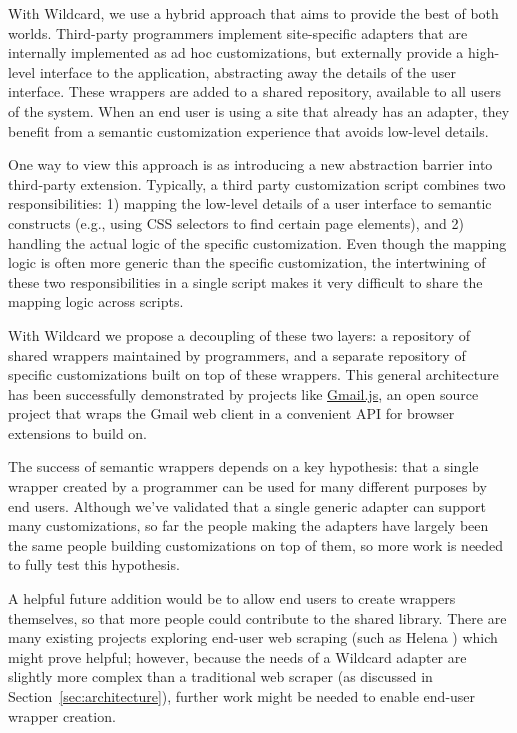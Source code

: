\documentclass[sigplan,screen,10pt,anonymous,review]{acmart}
\begin{document}
With Wildcard, we use a hybrid approach that aims to provide the best of
both worlds. Third-party programmers implement site-specific adapters
that are internally implemented as ad hoc customizations, but externally
provide a high-level interface to the application, abstracting away the
details of the user interface. These wrappers are added to a shared
repository, available to all users of the system. When an end user is
using a site that already has an adapter, they benefit from a semantic
customization experience that avoids low-level details.

One way to view this approach is as introducing a new abstraction
barrier into third-party extension. Typically, a third party
customization script combines two responsibilities: 1) mapping the
low-level details of a user interface to semantic constructs (e.g.,
using CSS selectors to find certain page elements), and 2) handling the
actual logic of the specific customization. Even though the mapping
logic is often more generic than the specific customization, the
intertwining of these two responsibilities in a single script makes it
very difficult to share the mapping logic across scripts.

With Wildcard we propose a decoupling of these two layers: a repository
of shared wrappers maintained by programmers, and a separate repository
of specific customizations built on top of these wrappers. This general
architecture has been successfully demonstrated by projects like
\href{https://github.com/KartikTalwar/gmail.js/}{Gmail.js}, an open
source project that wraps the Gmail web client in a convenient API for
browser extensions to build on.

The success of semantic wrappers depends on a key hypothesis: that a
single wrapper created by a programmer can be used for many different
purposes by end users. Although we've validated that a single generic
adapter can support many customizations, so far the people making the
adapters have largely been the same people building customizations on
top of them, so more work is needed to fully test this hypothesis.

A helpful future addition would be to allow end users to create wrappers
themselves, so that more people could contribute to the shared library.
There are many existing projects exploring end-user web scraping (such
as Helena \citep{chasins2018}) which might prove helpful; however,
because the needs of a Wildcard adapter are slightly more complex than a
traditional web scraper (as discussed in
Section~\ref{sec:architecture}), further work might be needed to enable
end-user wrapper creation.
\end{document}
